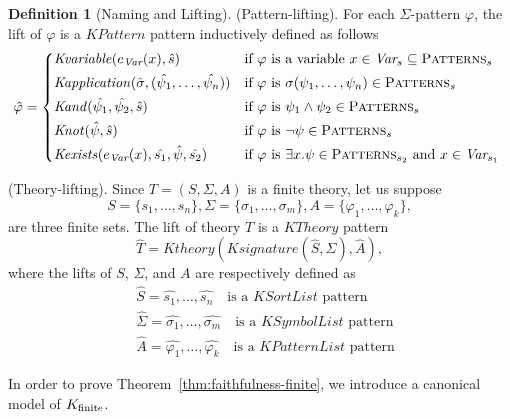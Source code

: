 \documentclass[UTF8,11pt]{article}
\newcounter{thmcounter}
\theoremstyle{plain}
\theoremstyle{definition}
\newtheorem{definition} [thmcounter]{Definition}
\theoremstyle{remark}
\newcommand{\PATTERNS}{\text{P\textsc{atterns}}}
\newcommand{\KPatternList}{\mathit{KPatternList}}
\newcommand{\KSortList}{\mathit{KSortList}}
\newcommand{\KSymbolList}{\mathit{KSymbolList}}
\newcommand{\KPattern}{\mathit{KPattern}}
\newcommand{\Kvariable}{\mathit{Kvariable}}
\newcommand{\Kand}{\mathit{Kand}}
\newcommand{\Knot}{\mathit{Knot}}
\newcommand{\Kapplication}{\mathit{Kapplication}}
\newcommand{\Kexists}{\mathit{Kexists}}
\newcommand{\Ksignature}{\mathit{Ksignature}}
\newcommand{\KTheory}{\mathit{KTheory}}
\newcommand{\Ktheory}{\mathit{Ktheory}}
\begin{document}
\begin{definition}[Naming and Lifting]
    (Pattern-lifting).
    For each $\Sigma$-pattern $\varphi$, the lift of $\varphi$ is a $\KPattern$ pattern inductively defined as follows
    \begin{equation*}
      \hat{\varphi} =
      \begin{cases*}
        \Kvariable(e_\Var(x), \hat{s}) & if $\varphi$ is a variable $x \in \Var_s \subseteq \PATTERNS_s$
        \\
        \Kapplication(\hat{\sigma}, (\hat{\psi_1}, \dots, \hat{\psi_n})) & if $\varphi$ is $\sigma(\psi_1,\dots,\psi_n) \in \PATTERNS_s$
        \\
        \Kand(\hat{\psi_1}, \hat{\psi_2}, \hat{s}) & if $\varphi$ is $\psi_1 \wedge \psi_2 \in \PATTERNS_s$
        \\
        \Knot(\hat{\psi}, \hat{s}) & if $\varphi$ is $\neg \psi \in \PATTERNS_s$
        \\
        \Kexists(e_\Var(x), \hat{s_1}, \hat{\psi}, \hat{s_2}) & if $\varphi$ is $\exists x . \psi \in \PATTERNS_{s_2}$ and $x \in \Var_{s_1}$
      \end{cases*}
    \end{equation*}
    
    (Theory-lifting). Since $T = (S, \Sigma, A)$ is a finite theory, let us suppose
    \begin{equation*}
       S = \{ s_1, \dots, s_n \}, 
       \Sigma = \{ \sigma_1, \dots, \sigma_m \}, 
       A = \{ \varphi_1, \dots, \varphi_k \},
    \end{equation*}
    are three finite sets. The lift of theory $T$ is a $\KTheory$ pattern 
    $$ \hat{T} = \Ktheory(\Ksignature(\hat{S}, \hat{\Sigma}), \hat{A}),$$
    where the lifts of $S$, $\Sigma$, and $A$ are respectively defined as
    \begin{align*}
    & \hat{S} = \hat{s_1},\dots,\hat{s_n} 
      \quad \text{is a $\KSortList$ pattern}
    \\
    & \hat{\Sigma} = \hat{\sigma_1},\dots,\hat{\sigma_m}
      \quad \text{is a $\KSymbolList$ pattern}
    \\
    & \hat{A} = \hat{\varphi_1}, \dots, \hat{\varphi_k}
      \quad \text{is a $\KPatternList$ pattern}
    \end{align*}
\end{definition}

In order to prove Theorem~\ref{thm:faithfulness-finite}, we introduce a canonical model of ${K_\text{finite}}$.
\end{document}
